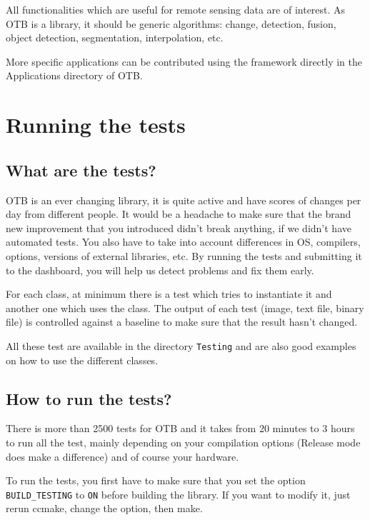 All functionalities which are useful for remote sensing data are of interest. As
OTB is a library, it should be generic algorithms: change, detection, fusion,
object detection, segmentation, interpolation, etc.

More specific applications can be contributed using the framework
directly in the Applications directory of OTB.

\section{Running the tests}\label{sec:runningTheTests}

\subsection{What are the tests?}

OTB is an ever changing library, it is quite active and have scores of
changes per day from different people. It would be a headache to make
sure that the brand new improvement that you introduced didn't break
anything, if we didn't have automated tests. You also have to take into
account differences in OS, compilers, options, versions of external
libraries, etc. By running the tests and submitting it to the dashboard,
you will help us detect problems and fix them early.

For each class, at minimum there is a test which tries to instantiate it and another one which uses the class. The output of each test (image, text file, binary file) is controlled against a baseline to make sure that the result hasn't changed.

All these test are available in the directory \texttt{Testing} and are also good examples on how to use the different classes.

\subsection{How to run the tests?}

There is more than 2500 tests for OTB and it takes from 20 minutes to 3 hours to run all the test, mainly depending on your compilation options (Release mode does make a difference) and of course your hardware.

To run the tests, you first have to make sure that you set the option \texttt{BUILD\_TESTING} to \texttt{ON} before building the library. If you want to modify it, just rerun ccmake, change the option, then make.

